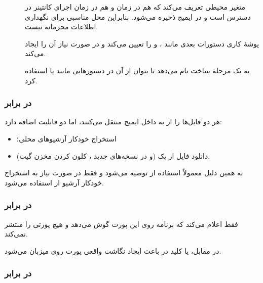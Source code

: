 \begin{description}
    \item[]
    متغیر محیطی تعریف می‌کند که هم در زمان  و هم در زمان اجرای کانتینر در دسترس است و در  ایمیج ذخیره می‌شود. بنابراین محل مناسبی برای نگهداری اطلاعات محرمانه نیست.

    \item[]
    پوشهٔ کاری دستورات بعدی مانند ،  و  را تعیین می‌کند و در صورت نیاز آن را ایجاد می‌کند.

    \item[]
    به یک مرحلهٔ ساخت نام می‌دهد تا بتوان از آن در دستورهایی مانند  یا  استفاده کرد.
\end{description}

\subsubsection*{ در برابر }

هر دو فایل‌ها را از  به داخل ایمیج منتقل می‌کنند، اما  دو قابلیت اضافه دارد:

\begin{itemize}
    \item استخراج خودکار آرشیوهای محلی؛
    \item دانلود فایل از یک  (و در نسخه‌های جدید ، کلون کردن مخزن گیت).
\end{itemize}

به همین دلیل معمولاً استفاده از  توصیه می‌شود و فقط در صورت نیاز به استخراج خودکار آرشیو از  استفاده می‌شود.

\subsubsection*{ در برابر }

 فقط اعلام می‌کند که برنامه روی این پورت گوش می‌دهد و هیچ پورتی را منتشر نمی‌کند.

در مقابل،  یا کلید  در  باعث ایجاد نگاشت واقعی پورت روی میزبان می‌شود.

\subsubsection*{ در برابر }


